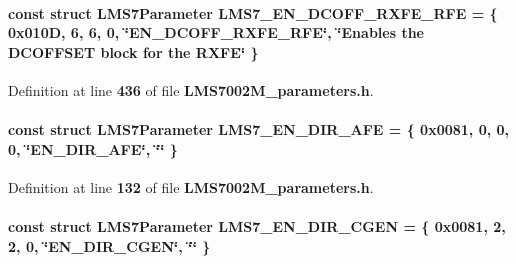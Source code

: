 \paragraph[{L\+M\+S7\+\_\+\+E\+N\+\_\+\+D\+C\+O\+F\+F\+\_\+\+R\+X\+F\+E\+\_\+\+R\+FE}]{\setlength{\rightskip}{0pt plus 5cm}const struct {\bf L\+M\+S7\+Parameter} L\+M\+S7\+\_\+\+E\+N\+\_\+\+D\+C\+O\+F\+F\+\_\+\+R\+X\+F\+E\+\_\+\+R\+FE = \{ 0x010\+D, 6, 6, 0, \char`\"{}\+E\+N\+\_\+\+D\+C\+O\+F\+F\+\_\+\+R\+X\+F\+E\+\_\+\+R\+F\+E\char`\"{}, \char`\"{}\+Enables the D\+C\+O\+F\+F\+S\+E\+T block for the R\+X\+F\+E\char`\"{} \}\hspace{0.3cm}{\ttfamily [static]}}\label{LMS7002M__parameters_8h_a7ef0a9be4572690b95ef364da7c8583b}


Definition at line {\bf 436} of file {\bf L\+M\+S7002\+M\+\_\+parameters.\+h}.

\paragraph[{L\+M\+S7\+\_\+\+E\+N\+\_\+\+D\+I\+R\+\_\+\+A\+FE}]{\setlength{\rightskip}{0pt plus 5cm}const struct {\bf L\+M\+S7\+Parameter} L\+M\+S7\+\_\+\+E\+N\+\_\+\+D\+I\+R\+\_\+\+A\+FE = \{ 0x0081, 0, 0, 0, \char`\"{}\+E\+N\+\_\+\+D\+I\+R\+\_\+\+A\+F\+E\char`\"{}, \char`\"{}\char`\"{} \}\hspace{0.3cm}{\ttfamily [static]}}\label{LMS7002M__parameters_8h_a567c3a515e20bbafb89388c3df7bdccd}


Definition at line {\bf 132} of file {\bf L\+M\+S7002\+M\+\_\+parameters.\+h}.

\paragraph[{L\+M\+S7\+\_\+\+E\+N\+\_\+\+D\+I\+R\+\_\+\+C\+G\+EN}]{\setlength{\rightskip}{0pt plus 5cm}const struct {\bf L\+M\+S7\+Parameter} L\+M\+S7\+\_\+\+E\+N\+\_\+\+D\+I\+R\+\_\+\+C\+G\+EN = \{ 0x0081, 2, 2, 0, \char`\"{}\+E\+N\+\_\+\+D\+I\+R\+\_\+\+C\+G\+E\+N\char`\"{}, \char`\"{}\char`\"{} \}\hspace{0.3cm}{\ttfamily [static]}}\label{LMS7002M__parameters_8h_a4736179fe625ef934b6223e9bcfa2fd9}


